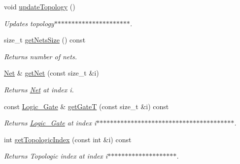 \begin{DoxyCompactItemize}
\begin{DoxyCompactList}
 \end{DoxyCompactList}\item 
void \hyperlink{classCircuit__Netlist_ac5ab8d692eb5d18bed59e41d2c55b678}{update\-Topology} ()
\begin{DoxyCompactList}\small\item\em Updates topology$\ast$$\ast$$\ast$$\ast$$\ast$$\ast$$\ast$$\ast$$\ast$$\ast$$\ast$$\ast$$\ast$$\ast$$\ast$$\ast$$\ast$$\ast$$\ast$$\ast$$\ast$$\ast$. \end{DoxyCompactList}\item 
size\-\_\-t \hyperlink{classCircuit__Netlist_a9bcee2cb05504ee65f3e70df9f89f576}{get\-Nets\-Size} () const 
\begin{DoxyCompactList}\small\item\em Returns number of nets. \end{DoxyCompactList}\item 
\hyperlink{structCircuit__Netlist_1_1Net}{Net} \& \hyperlink{classCircuit__Netlist_ad894dfb5dabad7c657c450d32adda23d}{get\-Net} (const size\-\_\-t \&i)
\begin{DoxyCompactList}\small\item\em Returns \hyperlink{structCircuit__Netlist_1_1Net}{Net} at index i. \end{DoxyCompactList}\item 
const \hyperlink{structCircuit__Netlist_1_1Logic__Gate}{Logic\-\_\-\-Gate} \& \hyperlink{classCircuit__Netlist_a3413fe728fb06a6b5b71be6d676b59de}{get\-Gate\-T} (const size\-\_\-t \&i) const 
\begin{DoxyCompactList}\small\item\em Returns \hyperlink{structCircuit__Netlist_1_1Logic__Gate}{Logic\-\_\-\-Gate} at index i$\ast$$\ast$$\ast$$\ast$$\ast$$\ast$$\ast$$\ast$$\ast$$\ast$$\ast$$\ast$$\ast$$\ast$$\ast$$\ast$$\ast$$\ast$$\ast$$\ast$$\ast$$\ast$$\ast$$\ast$$\ast$$\ast$$\ast$$\ast$$\ast$$\ast$$\ast$$\ast$$\ast$$\ast$$\ast$$\ast$$\ast$$\ast$$\ast$$\ast$. \end{DoxyCompactList}\item 
int \hyperlink{classCircuit__Netlist_a287e1aaee9b917ce7d1192b7c3914009}{get\-Topologic\-Index} (const int \&i) const 
\begin{DoxyCompactList}\small\item\em Returns Topologic index at index i$\ast$$\ast$$\ast$$\ast$$\ast$$\ast$$\ast$$\ast$$\ast$$\ast$$\ast$$\ast$$\ast$$\ast$$\ast$$\ast$$\ast$$\ast$$\ast$$\ast$. \end{DoxyCompactList}\item 

\end{DoxyCompactItemize}
